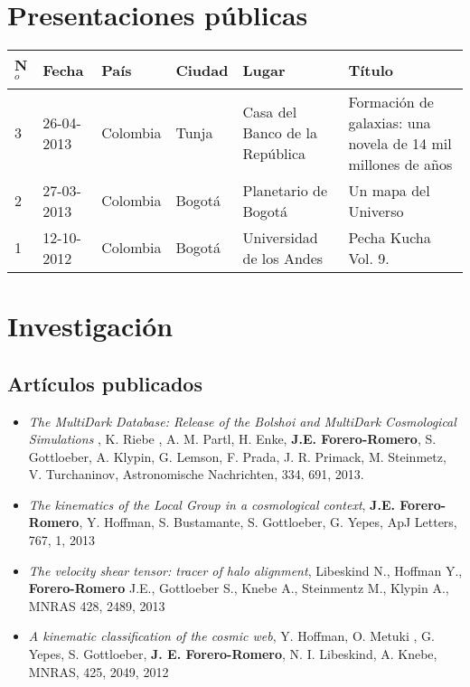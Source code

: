 \documentclass{article}
\begin{document}
\section*{Presentaciones p\'ublicas}

\begin{tabular}{lp{2.0cm} p{1.2cm} p{1.5cm} p{2cm} p{5cm}}\hline
N$^{o}$ & Fecha & Pa\'is & Ciudad & Lugar & T\'itulo\\\hline
3 & 26-04-2013 & Colombia & Tunja & Casa del Banco de la Rep\'ublica &
Formaci\'on de galaxias: una novela de 14 mil millones de a\~nos\\  
2 & 27-03-2013 & Colombia & Bogot\'a & Planetario de Bogot\'a & Un mapa del
Universo\\
1 & 12-10-2012 & Colombia & Bogot\'a & Universidad de los Andes & Pecha
Kucha Vol. 9.\\ \hline
\end{tabular}

\section*{Investigaci\'on}

\subsection*{Art\'iculos publicados}

\begin{itemize}
\item {\it The MultiDark Database: Release of the Bolshoi and MultiDark Cosmological Simulations} , K. Riebe , A. M. Partl, H. Enke, {\bf J.E. Forero-Romero}, S. Gottloeber, A. Klypin, G. Lemson, F. Prada, J. R. Primack, M. Steinmetz, V. Turchaninov, Astronomische Nachrichten, 334, 691, 2013.

\item {\it The kinematics of the Local Group in a cosmological context}, 
{\bf J.E. Forero-Romero}, Y. Hoffman, S. Bustamante, S. Gottloeber, G. Yepes, ApJ Letters, 767, 1, 2013

\item {\it The velocity shear tensor: tracer of halo alignment}, Libeskind N., Hoffman Y., {\bf Forero-Romero} J.E., Gottloeber S., Knebe A., Steinmentz M., Klypin A., MNRAS 428, 2489, 2013

\item {\it A kinematic classification of the cosmic web}, Y. Hoffman, O. Metuki , G. Yepes, S. Gottloeber, {\bf J. E. Forero-Romero}, N. I. Libeskind, A. Knebe, MNRAS, 425, 2049, 2012
\end{itemize}
\end{document}
